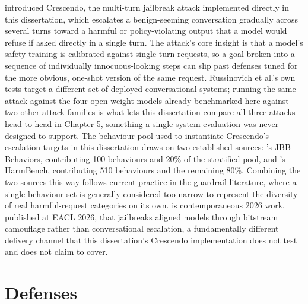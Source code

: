 \citet{russinovich2025great} introduced Crescendo, the multi-turn
jailbreak attack implemented directly in this dissertation, which
escalates a benign-seeming conversation gradually across several turns
toward a harmful or policy-violating output that a model would refuse if
asked directly in a single turn. The attack's core insight is that a
model's safety training is calibrated against single-turn requests, so a
goal broken into a sequence of individually innocuous-looking steps can
slip past defenses tuned for the more obvious, one-shot version of the
same request. Russinovich et al.'s own tests target a different set of
deployed conversational systems; running the same attack against the
four open-weight models already benchmarked here against two other
attack families is what lets this dissertation compare all three attacks
head to head in Chapter 5, something a single-system evaluation was
never designed to support. The behaviour pool used to instantiate
Crescendo's escalation targets in this dissertation draws on two
established sources: \citet{chao2024jailbreakbench}'s JBB-Behaviors,
contributing 100 behaviours and 20\% of the stratified pool, and
\citet{mazeika2024harmbench}'s HarmBench, contributing 510 behaviours
and the remaining 80\%. Combining the two sources this way follows
current practice in the guardrail literature, where a single behaviour
set is generally considered too narrow to represent the diversity of
real harmful-request categories on its own. \citet{nakka2026bitbypass}
is contemporaneous 2026 work, published at EACL 2026, that jailbreaks
aligned models through bitstream camouflage rather than conversational
escalation, a fundamentally different delivery channel that this
dissertation's Crescendo implementation does not test and does not
claim to cover.

\section{Defenses}

